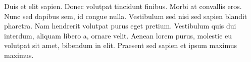 Duis et elit sapien. Donec volutpat tincidunt finibus. Morbi at convallis eros. Nunc sed dapibus sem, id congue nulla. Vestibulum sed nisi sed sapien blandit pharetra. Nam hendrerit volutpat purus eget pretium. Vestibulum quis dui interdum, aliquam libero a, ornare velit. Aenean lorem purus, molestie eu volutpat sit amet, bibendum in elit. Praesent sed sapien et ipsum maximus maximus.